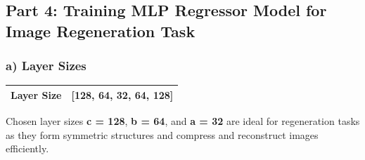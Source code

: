 \documentclass{article}
\begin{document}
\subsection*{Part 4: Training MLP Regressor Model for Image Regeneration Task}
\subsubsection*{a) Layer Sizes}
\begin{table}[H]
    \centering
    \begin{tabular}{|c|c|} %
        \hline
        \textbf{Layer Size} & \textbf{[128, 64, 32, 64, 128]} \\ \hline
    \end{tabular}
\end{table}

\hspace{-3pt}
Chosen layer sizes \textbf{c = 128}, \textbf{b = 64}, and \textbf{a = 32} are ideal for regeneration tasks as they form symmetric structures and compress and reconstruct images efficiently.
\end{document}
